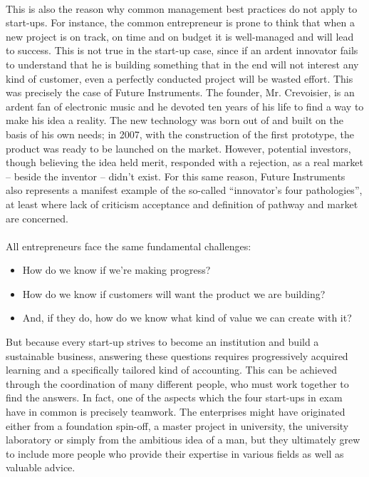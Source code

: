\documentclass[twoside]{report}
\begin{document}
\paragraph{}
This is also the reason why common management best practices do not apply to start-ups. For instance, the common entrepreneur is prone to think that when a new project is on track, on time and on budget it is well-managed and will lead to success. This is not true in the start-up case, since if an ardent innovator fails to understand that he is building something that in the end will not interest any kind of customer, even a perfectly conducted project will be wasted effort. This was precisely the case of Future Instruments. The founder, Mr. Crevoisier, is an ardent fan of electronic music and he devoted ten years of his life to find a way to make his idea a reality. The new technology was born out of and built on the basis of his own needs; in 2007, with the construction of the first prototype, the product was ready to be launched on the market. However, potential investors, though believing the idea held merit, responded with a rejection, as a real market – beside the inventor – didn’t exist. For this same reason, Future Instruments also represents a manifest example of the so-called “innovator’s four pathologies”, at least where lack of criticism acceptance and definition of pathway and market are concerned. 
\paragraph{}
\cite{ries_is_2010}
All entrepreneurs face the same fundamental challenges:
\begin{itemize}
\item How do we know if we’re making progress?
\item How do we know if customers will want the product we are building?
\item And, if they do, how do we know what kind of value we can create with it? 
\end{itemize}
But because every start-up strives to become an institution and build a sustainable business, answering these questions requires progressively acquired learning and a specifically tailored kind of accounting. This can be achieved through the coordination of many different people, who must work together to find the answers. In fact, one of the aspects which the four start-ups in exam have in common is precisely teamwork. The enterprises might have originated either from a foundation spin-off, a master project in university, the university laboratory or simply from the ambitious idea of a man, but they ultimately grew to include more people who provide their expertise in various fields as well as valuable advice. 
\end{document}
